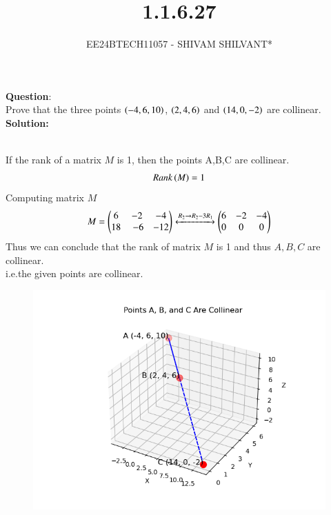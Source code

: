 \documentclass[journal]{IEEEtran}
\begin{document}

\vspace{3cm}

\title{1.1.6.27}
\author{EE24BTECH11057 - SHIVAM SHILVANT*
}
{\let\newpage\relax\maketitle}

\renewcommand{\thefigure}{\theenumi}
\renewcommand{\thetable}{\theenumi}
\setlength{\intextsep}{10pt} %


\renewcommand{\thetable}{\theenumi}


\textbf{Question}:\\
Prove that the three points $\left(-4, 6, 10\right)$, $\left(2, 4, 6\right)$ and $\left(14, 0, -2\right)$ are collinear.\\ 
\textbf{Solution: }\\
    \begin{table}[h!]    
      \centering
      
      \caption{}
    \end{table}\\
If the rank of a matrix $M$ is 1, then the points A,B,C are collinear. 
    \begin{align}
        Rank\left(M\right) = 1\label{eq1.1.6.22.1}
    \end{align}
Computing matrix $M$
    \begin{align}
        M = \begin{pmatrix}6 & -2 & -4 \\ 18 & \ -6 & -12\end{pmatrix}
        \xleftrightarrow[]{R_2 \rightarrow {R_2-3R_1}}  \label{eq1.1.6.22.2}
        \begin{pmatrix}6 & -2 & -4 \\ 0 & 0 & 0\end{pmatrix}
    \end{align}
Thus we can conclude that the rank of matrix $M$ is 1 and thus $A,B,C$ are collinear. \\i.e.the given points are collinear.\\
    \begin{figure}[h]
        \centering
       \includegraphics[width=0.7\linewidth]{figs/fig1.png}
       \caption{}
       \label{graph}
    \end{figure}
\end{document}
